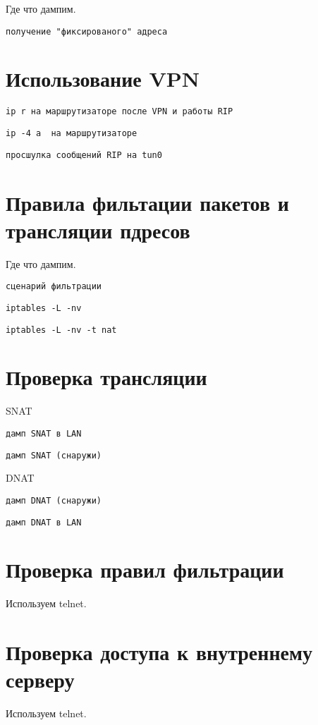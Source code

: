 \documentclass[a4paper,12pt]{article}
\begin{document}
Где что дампим.

\begin{Verbatim}
получение "фиксированого" адреса
\end{Verbatim}


\section{Использование VPN}

\begin{Verbatim}
ip r на маршрутизаторе после VPN и работы RIP
\end{Verbatim}

\begin{Verbatim}
ip -4 a  на маршрутизаторе
\end{Verbatim}

\begin{Verbatim}
просшулка сообщений RIP на tun0
\end{Verbatim}


\section{Правила фильтации пакетов и трансляции пдресов}

Где что дампим.

\begin{Verbatim}
сценарий фильтрации
\end{Verbatim}

\begin{Verbatim}
iptables -L -nv
\end{Verbatim}

\begin{Verbatim}
iptables -L -nv -t nat
\end{Verbatim}

\section{Проверка трансляции}

SNAT

\begin{Verbatim}
дамп SNAT в LAN
\end{Verbatim}

\begin{Verbatim}
дамп SNAT (снаружи)
\end{Verbatim}

DNAT

\begin{Verbatim}
дамп DNAT (снаружи)
\end{Verbatim}

\begin{Verbatim}
дамп DNAT в LAN
\end{Verbatim}


\section{Проверка правил фильтрации}

Используем telnet.

\section{Проверка доступа к внутреннему серверу}

Используем telnet.
\end{document}

